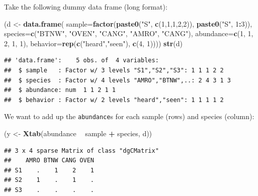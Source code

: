 \documentclass[12pt,]{book}
\newenvironment{Shaded}{\begin{snugshade}}{\end{snugshade}}
\newcommand{\DataTypeTok}[1]{\textcolor[rgb]{0.13,0.29,0.53}{#1}}
\newcommand{\DecValTok}[1]{\textcolor[rgb]{0.00,0.00,0.81}{#1}}
\newcommand{\KeywordTok}[1]{\textcolor[rgb]{0.13,0.29,0.53}{\textbf{#1}}}
\newcommand{\NormalTok}[1]{#1}
\newcommand{\OperatorTok}[1]{\textcolor[rgb]{0.81,0.36,0.00}{\textbf{#1}}}
\newcommand{\StringTok}[1]{\textcolor[rgb]{0.31,0.60,0.02}{#1}}
\begin{document}
Take the following dummy data frame (long format):

\begin{Shaded}
\begin{Highlighting}[]
\NormalTok{(d <-}\StringTok{ }\KeywordTok{data.frame}\NormalTok{(}
  \DataTypeTok{sample=}\KeywordTok{factor}\NormalTok{(}\KeywordTok{paste0}\NormalTok{(}\StringTok{"S"}\NormalTok{, }\KeywordTok{c}\NormalTok{(}\DecValTok{1}\NormalTok{,}\DecValTok{1}\NormalTok{,}\DecValTok{1}\NormalTok{,}\DecValTok{2}\NormalTok{,}\DecValTok{2}\NormalTok{)), }\KeywordTok{paste0}\NormalTok{(}\StringTok{"S"}\NormalTok{, }\DecValTok{1}\OperatorTok{:}\DecValTok{3}\NormalTok{)),}
  \DataTypeTok{species=}\KeywordTok{c}\NormalTok{(}\StringTok{"BTNW"}\NormalTok{, }\StringTok{"OVEN"}\NormalTok{, }\StringTok{"CANG"}\NormalTok{, }\StringTok{"AMRO"}\NormalTok{, }\StringTok{"CANG"}\NormalTok{),}
  \DataTypeTok{abundance=}\KeywordTok{c}\NormalTok{(}\DecValTok{1}\NormalTok{, }\DecValTok{1}\NormalTok{, }\DecValTok{2}\NormalTok{, }\DecValTok{1}\NormalTok{, }\DecValTok{1}\NormalTok{),}
  \DataTypeTok{behavior=}\KeywordTok{rep}\NormalTok{(}\KeywordTok{c}\NormalTok{(}\StringTok{"heard"}\NormalTok{,}\StringTok{"seen"}\NormalTok{), }\KeywordTok{c}\NormalTok{(}\DecValTok{4}\NormalTok{, }\DecValTok{1}\NormalTok{))))}
\KeywordTok{str}\NormalTok{(d)}
\end{Highlighting}
\end{Shaded}

\begin{verbatim}
## 'data.frame':    5 obs. of  4 variables:
##  $ sample   : Factor w/ 3 levels "S1","S2","S3": 1 1 1 2 2
##  $ species  : Factor w/ 4 levels "AMRO","BTNW",..: 2 4 3 1 3
##  $ abundance: num  1 1 2 1 1
##  $ behavior : Factor w/ 2 levels "heard","seen": 1 1 1 1 2
\end{verbatim}

We want to add up the \texttt{abundance}s for each sample (rows) and species (column):

\begin{Shaded}
\begin{Highlighting}[]
\NormalTok{(y <-}\StringTok{ }\KeywordTok{Xtab}\NormalTok{(abundance }\OperatorTok{~}\StringTok{ }\NormalTok{sample }\OperatorTok{+}\StringTok{ }\NormalTok{species, d))}
\end{Highlighting}
\end{Shaded}

\begin{verbatim}
## 3 x 4 sparse Matrix of class "dgCMatrix"
##    AMRO BTNW CANG OVEN
## S1    .    1    2    1
## S2    1    .    1    .
## S3    .    .    .    .
\end{verbatim}
\end{document}
